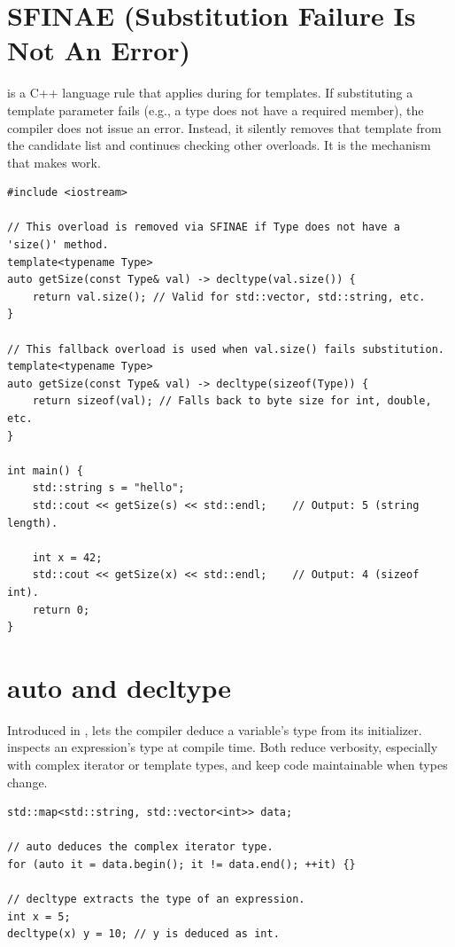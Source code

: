 \section{SFINAE (Substitution Failure Is Not An Error)}
 is a C++ language rule that applies during  for templates. If substituting a template parameter fails (e.g., a type does not have a required member), the compiler does not issue an error. Instead, it silently removes that template from the candidate list and continues checking other overloads. It is the mechanism that makes  work.
\begin{lstlisting}
#include <iostream>

// This overload is removed via SFINAE if Type does not have a 'size()' method.
template<typename Type>
auto getSize(const Type& val) -> decltype(val.size()) {
    return val.size(); // Valid for std::vector, std::string, etc.
}

// This fallback overload is used when val.size() fails substitution.
template<typename Type>
auto getSize(const Type& val) -> decltype(sizeof(Type)) {
    return sizeof(val); // Falls back to byte size for int, double, etc.
}

int main() {
    std::string s = "hello";
    std::cout << getSize(s) << std::endl;    // Output: 5 (string length).

    int x = 42;
    std::cout << getSize(x) << std::endl;    // Output: 4 (sizeof int).
    return 0;
}
\end{lstlisting}

\section{auto and decltype}
Introduced in ,  lets the compiler deduce a variable's type from its initializer.  inspects an expression's type at compile time. Both reduce verbosity, especially with complex iterator or template types, and keep code maintainable when types change.
\begin{lstlisting}
std::map<std::string, std::vector<int>> data;

// auto deduces the complex iterator type.
for (auto it = data.begin(); it != data.end(); ++it) {}

// decltype extracts the type of an expression.
int x = 5;
decltype(x) y = 10; // y is deduced as int.
\end{lstlisting}

